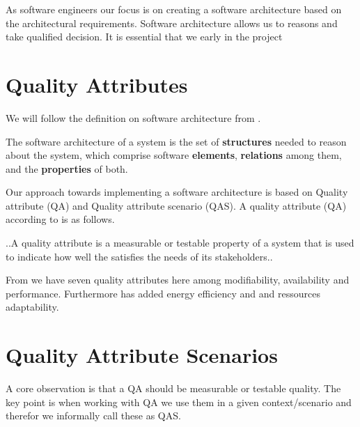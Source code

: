As software engineers our focus is on creating a software architecture based on the architectural requirements. Software architecture allows us to reasons and take qualified decision. It is essential that we early in the project    \cite{un}

\section{Quality Attributes}
We will follow the definition on software architecture from \cite{Bass}. 
\begin{defi}
The software architecture of a system is the set of \textbf{structures} needed to reason about the system, which comprise software \textbf{elements}, \textbf{relations} among them, and the \textbf{properties} of both. 
\end{defi}

\noindent
Our approach towards implementing a software architecture is based on Quality attribute (QA) and Quality attribute scenario (QAS). A quality attribute (QA) according to \cite{Bass} is as follows.

\begin{defi}
..A quality attribute is a measurable or testable property of a system that is used to indicate how well the satisfies the needs of its stakeholders..  
\end{defi}


\noindent
From \cite{Bass} we have seven quality attributes here among modifiability, availability and performance. Furthermore \cite{Kjaergaard:2015:AQT:2737182.2737196} has added energy efficiency and and ressources adaptability.  



\section{Quality Attribute Scenarios}
\noindent
A core observation is that a QA should be measurable or testable quality. The key point is when working with QA we use them in a given context/scenario and therefor we informally call these as QAS.\\




